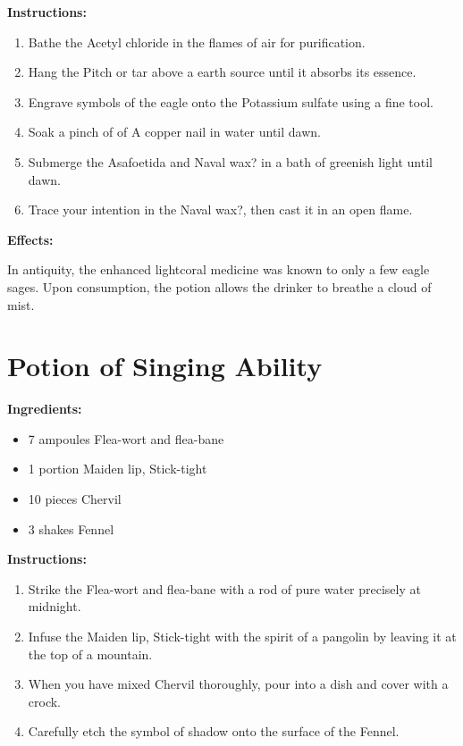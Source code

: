 \documentclass{article}
\begin{document}
\textbf{Instructions:}

\begin{enumerate}
  \item Bathe the Acetyl chloride in the flames of air for purification.
  \item Hang the Pitch or tar above a earth source until it absorbs its essence.
  \item Engrave symbols of the eagle onto the Potassium sulfate using a fine tool.
  \item Soak a pinch of of A copper nail in water until dawn.
  \item Submerge the Asafoetida and Naval wax? in a bath of greenish light until dawn.
  \item Trace your intention in the Naval wax?, then cast it in an open flame.
\end{enumerate}

\textbf{Effects:}

In antiquity, the enhanced lightcoral medicine was known to only a few eagle sages. Upon consumption, the potion allows the drinker to breathe a cloud of mist.

\newpage
\section*{Potion of Singing Ability}

\textbf{Ingredients:}

\begin{itemize}
  \item 7 ampoules Flea-wort and flea-bane
  \item 1 portion Maiden lip, Stick-tight
  \item 10 pieces Chervil
  \item 3 shakes Fennel
\end{itemize}

\textbf{Instructions:}

\begin{enumerate}
  \item Strike the Flea-wort and flea-bane with a rod of pure water precisely at midnight.
  \item Infuse the Maiden lip, Stick-tight with the spirit of a pangolin by leaving it at the top of a mountain.
  \item When you have mixed Chervil thoroughly, pour into a dish and cover with a crock.
  \item Carefully etch the symbol of shadow onto the surface of the Fennel.
\end{enumerate}
\end{document}
